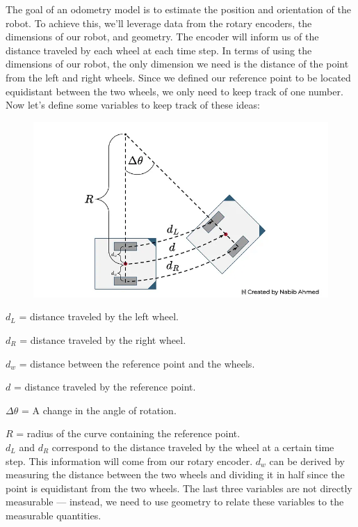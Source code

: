 The goal of an odometry model is to estimate the position and orientation of the robot. To achieve this, we’ll leverage data from the rotary encoders, the dimensions of our robot, and geometry. The encoder will inform us of the distance traveled by each wheel at each time step. In terms of using the dimensions of our robot, the only dimension we need is the distance of the point from the left and right wheels. Since we defined our reference point to be located equidistant between the two wheels, we only need to keep track of one number.\\

Now let’s define some variables to keep track of these ideas:
\begin{figure}[H]
	\centering
	\includegraphics[width=0.8\linewidth]{figures/odom.png}
	\caption{}
	\label{fig:odom}
\end{figure}

\quad \quad $d_L$ = distance traveled by the left wheel.

\quad \quad $d_R$ = distance traveled by the right wheel.

\quad \quad $d_w$ = distance between the reference point and the wheels.

\quad \quad $d$ = distance traveled by the reference point.

\quad \quad $\Delta \theta$ = A change in the angle of rotation.

\quad \quad $R$ = radius of the curve containing the reference point.\\

$d_L$ and $d_R$ correspond to the distance traveled by the wheel at a certain time step. This information will come from our rotary encoder. $d_w$ can be derived by measuring the distance between the two wheels and dividing it in half since the point is equidistant from the two wheels. The last three variables are not directly measurable — instead, we need to use geometry to relate these variables to the measurable quantities.\\

